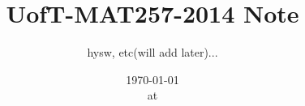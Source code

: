 

\usepackage{datetime}
\usepackage{fancyhdr}

\newcommand{\refto}[1]{\{#1\}}
\newcommand{\extranote}[1]{{\color{Black!30}#1}}
\newcommand{\thmIF}{\textbf{\color{Red!50!Black}IF}}
\newcommand{\thmTHEN}{\textbf{\color{Blue!50!Black}THEN}}

\title{UofT-MAT257-2014 Note}
\author{hysw, etc(will add later)...}
\date{\today\\ at \currenttime}

\pagestyle{fancy}
\rfoot{}
\cfoot{}
\lfoot{}